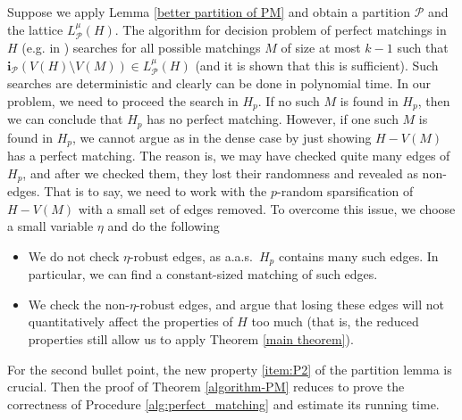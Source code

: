 \documentclass[11pt, letterpaper]{amsart}
\theoremstyle{plain}
\numberwithin{equation}{section}
\theoremstyle{definition}
\renewcommand{\vec}[1]{{\mathbf #1}}
\begin{document}
Suppose we apply Lemma \ref{better partition of PM} and obtain a partition $\mathcal P$ and the lattice $ L^{\mu}_{\mathcal{P}}(H) $.
The algorithm for decision problem of perfect matchings in $H$ (e.g. in \cite{han2017decision}) searches for all possible matchings $M$ of size at most $k-1$ such that $\vec{i}_{\mathcal P}(V(H)\setminus V(M))\in L^{\mu}_{\mathcal{P}}(H)$ (and it is shown that this is sufficient).
Such searches are deterministic and clearly can be done in polynomial time.
In our problem, we need to proceed the search in $H_p$.
If no such $M$ is found in $H_p$, then we can conclude that $H_p$ has no perfect matching.
However, if one such $M$ is found in $H_p$, we cannot argue as in the dense case by just showing $H-V(M)$ has a perfect matching.
The reason is, we may have checked quite many edges of $H_p$, and after we checked them, they lost their randomness and revealed as non-edges.
That is to say, we need to work with the $p$-random sparsification of $H-V(M)$ with a small set of edges removed.
To overcome this issue, we choose a small variable $\eta$ and do the following
\begin{itemize}
    \item We do not check $\eta$-robust edges, as a.a.s.~$H_p$ contains many such edges. In particular, we can find a constant-sized matching of such edges.
    \item We check the non-$\eta$-robust edges, and argue that losing these edges will not quantitatively affect the properties of $H$ too much (that is, the reduced properties still allow us to apply Theorem \ref{main theorem}).
\end{itemize}
For the second bullet point, the new property \ref{item:P2} of the partition lemma is crucial.
Then the proof of Theorem \ref{algorithm-PM} reduces to prove the correctness of Procedure \ref{alg:perfect_matching} and estimate its running time.
\end{document}
